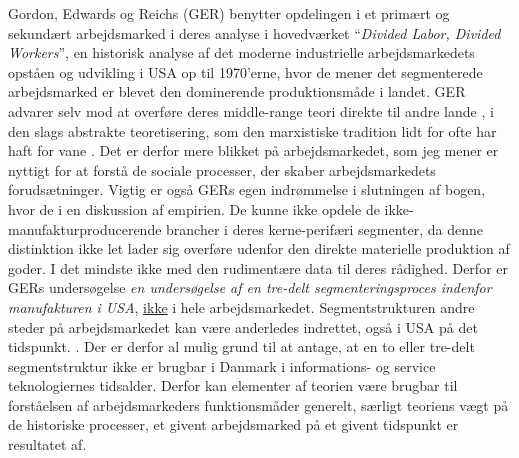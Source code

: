 Gordon, Edwards og Reichs (GER) benytter opdelingen i et primært og sekundært arbejdsmarked i deres analyse i hovedværket “\emph{Divided Labor, Divided Workers}”, en historisk analyse af det moderne industrielle arbejdsmarkedets opståen og udvikling i USA op til 1970'erne, hvor de mener det segmenterede arbejdsmarked er blevet den dominerende produktionsmåde i landet. GER advarer selv mod at overføre deres middle-range teori direkte til andre lande , i den slags abstrakte teoretisering, som den marxistiske tradition lidt for ofte har haft for vane \parencite[21]{Gordon1982}. Det er derfor mere blikket på arbejdsmarkedet, som jeg mener er nyttigt for at forstå de sociale processer, der skaber arbejdsmarkedets forudsætninger. Vigtig er også GERs egen indrømmelse i slutningen af bogen, hvor de i en diskussion af empirien. De kunne ikke opdele de ikke-manufakturproducerende brancher i deres kerne-perifæri segmenter, da denne distinktion ikke let lader sig overføre udenfor den direkte materielle produktion af goder. I det mindste ikke med den rudimentære data til deres rådighed. Derfor er GERs undersøgelse \emph{en undersøgelse af en tre-delt segmenteringsproces indenfor manufakturen i USA}, \underline{ikke} i hele arbejdsmarkedet. Segmentstrukturen andre steder på arbejdsmarkedet kan være anderledes indrettet, også i USA på det tidspunkt. \parencite[199]{Gordon1982}. Der er derfor al mulig grund til at antage, at en to eller tre-delt segmentstruktur ikke er brugbar i Danmark i informations- og service teknologiernes tidsalder.  Derfor kan elementer af teorien være brugbar til forståelsen af arbejdsmarkeders funktionsmåder generelt, særligt teoriens vægt på de historiske processer, et givent arbejdsmarked på et givent tidspunkt er resultatet af.






